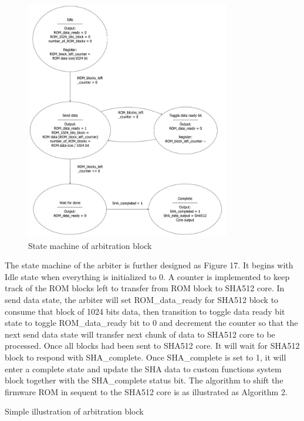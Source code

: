 \documentclass[review]{elsarticle}
\begin{document}
\begin{figure}[hbt!]
	\centering
	\includegraphics[width=0.8\textwidth]{figs/StateMachine.JPG}
	\caption{State machine of arbitration block}
\end{figure}


The state machine of the arbiter is further designed as Figure 17. It begins with Idle state when everything is initialized to 0. A counter is implemented to keep track of the ROM blocks left to transfer from ROM block to SHA512 core. In send data state, the arbiter will set ROM\_data\_ready for SHA512 block to consume that block of 1024 bits data, then transition to toggle data ready bit state to toggle ROM\_data\_ready bit to 0 and decrement the counter so that the next send data state will transfer next chunk of data to SHA512 core to be processed. Once all blocks had been sent to SHA512 core. It will wait for SHA512 block to respond with SHA\_complete. Once SHA\_complete is set to 1, it will enter a complete state and update the SHA data to custom functions system block together with the SHA\_complete status bit. The algorithm to shift the firmware ROM in sequent to the SHA512 core is as illustrated as Algorithm 2.


\begin{algorithm}
 \caption{Simple illustration of arbitration block}

\end{algorithm}
\end{document}
